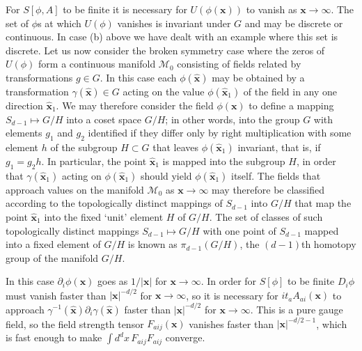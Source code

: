 For $S[\phi,A]$ to be finite it is necessary for $U(\phi(\mathbf{x}))$ to
vanish as $\mathbf{x}\to\infty$. The set of $\phi$s at which $U(\phi)$
vanishes is invariant under $G$ and may be discrete or continuous. In case
(b) above we have dealt with an example where this set is discrete. Let us
now consider the broken symmetry case where the zeros of $U(\phi)$ form a
continuous manifold $\mathcal M_0$ consisting of fields related by
transformations $g\in G$. In this case each $\phi(\hat{\mathbf{x}})$ may be
obtained by a transformation $\gamma(\hat{\mathbf{x}})\in G$ acting on the
value $\phi(\hat{\mathbf{x}}_1)$ of the field in any one direction
$\hat{\mathbf{x}}_1$. We may therefore consider the field $\phi(\mathbf{x})$
to define a mapping $S_{d-1}\mapsto G/H$ into a coset space $G/H$; in other
words, into the group $G$ with elements $g_1$ and $g_2$ identified if they
differ only by right multiplication with some element $h$ of the subgroup
$H\subset G$ that leaves $\phi(\hat{\mathbf{x}}_1)$ invariant, that is, if
$g_1=g_2h$. In particular, the point $\hat{\mathbf{x}}_1$ is mapped into
the subgroup $H$, in order that $\gamma(\hat{\mathbf{x}}_1)$ acting on
$\phi(\hat{\mathbf{x}}_1)$ should yield $\phi(\hat{\mathbf{x}}_1)$ itself.
The fields that approach values on the manifold $\mathcal M_0$ as
$\mathbf{x}\to\infty$ may therefore be classified according to the
topologically distinct mappings of $S_{d-1}$ into $G/H$ that map the point
$\hat{\mathbf{x}}_1$ into the fixed `unit' element $H$ of $G/H$. The set of
classes of such topologically distinct mappings $S_{d-1}\mapsto G/H$ with
one point of $S_{d-1}$ mapped into a fixed element of $G/H$ is known as
$\pi_{d-1}(G/H)$, the $(d-1)$th homotopy group of the manifold $G/H$.

In this case $\partial_i\phi(\mathbf{x})$ goes as $1/|\mathbf{x}|$ for
$\mathbf{x}\to\infty$. In order for $S[\phi]$ to be finite $D_i\phi$ must
vanish faster than $|\mathbf{x}|^{-d/2}$ for $\mathbf{x}\to\infty$, so it
is necessary for $it_a A_{a i}(\mathbf{x})$ to approach
$\gamma^{-1}(\hat{\mathbf{x}})\partial_i\gamma(\hat{\mathbf{x}})$ faster
than $|\mathbf{x}|^{-d/2}$ for $\mathbf{x}\to\infty$. This is a pure gauge
field, so the field strength tensor $F_{a ij}(\mathbf{x})$ vanishes
faster than $|\mathbf{x}|^{-d/2-1}$, which is fast enough to make
$\int d^d x\,F_{a ij}F_{a ij}$ converge.

